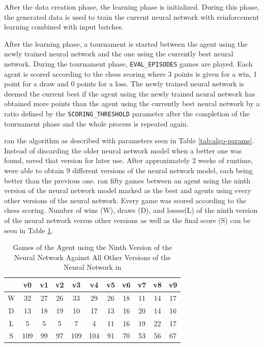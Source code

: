 After the data creation phase, the learning phase is initialized. During this phase, the generated data is used to train the current neural network with reinforcement learning combined with input batches.

After the learning phase, a tournament is started between the agent using the newly trained neural network and the one using the currently best neural network. During the tournament phase, \verb!EVAL_EPISODES! games are played. Each agent is scored according to the chess scoring where 3 points is given for a win, 1 point for a draw and 0 points for a loss. The newly trained neural network is deemed the current best if the agent using the newly trained neural network has obtained more points than the agent using the currently best neural network by a ratio defined by the \verb!SCORING_THRESHOLD! parameter after the completion of the tournament phase and the whole process is repeated again.

\cite{Popic_Boskovic_Brest_2021} ran the algorithm as described with parameters seen in Table \ref{tab:algo-params}. Instead of discarding the older neural network model when a better one was found, \cite{Popic_Boskovic_Brest_2021} saved that version for later use. After approximately 2 weeks of runtime, \cite{Popic_Boskovic_Brest_2021} were able to obtain 9 different versions of the neural network model, each being better than the previous one. \cite{Popic_Boskovic_Brest_2021} ran fifty games between an agent using the ninth version of the neural network model marked as the best and agents using every other versions of the neural network. Every game was scored according to the chess scoring. Number of wins (W), draws (D), and losses(L) of the ninth version of the neural network versus other versions as well as the final score (S) can be seen in Table \ref{tab:v9_summary}.

\begin{table}[htb]
    \centering
    \begin{tabular}{ccccccccccc}
        \hline
          & v0  & v1 & v2 & v3  & v4  & v5 & v6 & v7 & v8 & v9 \\ \hline
        W & 32  & 27 & 26 & 33  & 29  & 26 & 18 & 11 & 14 & 17 \\
        D & 13  & 18 & 19 & 10  & 17  & 13 & 16 & 20 & 14 & 16 \\
        L & 5   & 5  & 5  & 7   & 4   & 11 & 16 & 19 & 22 & 17 \\ \hline
        S & 109 & 99 & 97 & 109 & 104 & 91 & 70 & 53 & 56 & 67 \\ \hline
    \end{tabular}
    \caption{Games of the Agent using the Ninth Version of the Neural Network Against All Other Versions of the Neural Network in \cite{Popic_Boskovic_Brest_2021}}
    \label{tab:v9_summary}
\end{table}

